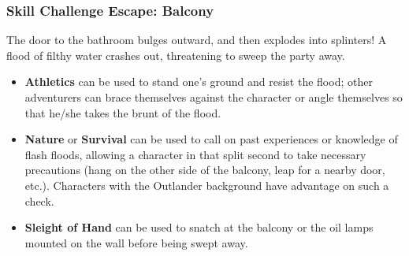 \begin{arealinks}
\end{arealinks}

\subsubsection*{Skill Challenge Escape: Balcony}
\label{sec:SC_Balcony}
\begin{readout}
  The door to the bathroom bulges outward, and then explodes into splinters! A flood of filthy water crashes
  out, threatening to sweep the party away.
\end{readout}
\begin{skillChallenge}
  \begin{itemize}
    \item \textbf{Athletics} can be used to stand one's ground and resist the flood; other adventurers can
    brace themselves against the character or angle themselves so that he/she takes the brunt of the flood.
    \moderateDC
    \item \textbf{Nature} or \textbf{Survival} can be used to call on past experiences or knowledge of flash
    floods, allowing a character in that split second to take necessary precautions (hang on the other side of
    the balcony, leap for a nearby door, etc.). Characters with the Outlander background have advantage on
    such a check. \moderateDC
    \item \textbf{Sleight of Hand} can be used to snatch at the balcony or the oil lamps mounted on the wall
    before being swept away. \easyDC
  \end{itemize}
\end{skillChallenge}


\pagebreak

